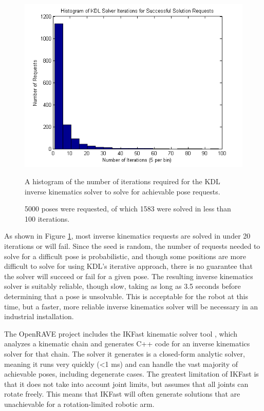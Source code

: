 \documentclass[]{cwru} %
\begin{document}
\begin{figure}[ht]
\centering
\includegraphics[width=6.0in]{KDL_histogram}
\caption{A histogram of the number of iterations required for the KDL inverse 
kinematics solver to solve for achievable pose requests.}
\caption*{5000 poses were requested, of which 1583 were solved in less than 
100 iterations.}
\label{fig:kdl-histo}
\end{figure}

As shown in Figure \ref{fig:kdl-histo}, most inverse kinematics requests are solved in
under 20 iterations or will fail. Since the seed is random, the number
of requests needed to solve for a difficult pose is probabilistic, and
though some positions are more difficult to solve for using KDL's
iterative approach, there is no guarantee that the solver will succeed
or fail for a given pose. The resulting inverse kinematics solver is
suitably reliable, though slow, taking as long as 3.5 seconds before
determining that a pose is unsolvable. This is acceptable for the robot
at this time, but a faster, more reliable inverse kinematics solver will
be necessary in an industrial installation.

The OpenRAVE project includes the IKFast kinematic solver tool \cite{openrave},
which analyzes a kinematic chain and generates C++ code for an inverse
kinematics solver for that chain. The solver it generates is a
closed-form analytic solver, meaning it runs very quickly (\textless{}1
ms) and can handle the vast majority of achievable poses, including
degenerate cases. The greatest limitation of IKFast is that it does not
take into account joint limits, but assumes that all joints can rotate
freely. This means that IKFast will often generate solutions that are
unachievable for a rotation-limited robotic arm.
\end{document}
